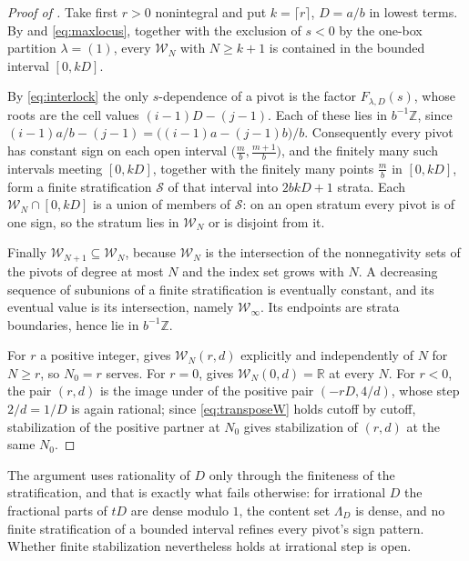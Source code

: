\documentclass[11pt,letterpaper]{article}
\newcommand{\Zint}{\mathbb{Z}}
\newcommand{\Rr}{\mathbb{R}}
\begin{document}
\begin{proof}[Proof of ]
Take first $r>0$ nonintegral and put $k=\lceil r\rceil$, $D=a/b$ in lowest terms.
By  and \eqref{eq:maxlocus}, together with the exclusion of $s<0$
by the one-box partition $\lambda=(1)$, every $\mathcal{W}_N$ with $N\ge k+1$ is
contained in the bounded interval $[0,kD]$.

By \eqref{eq:interlock} the only $s$-dependence of a pivot is the factor
$F_{\lambda,D}(s)$, whose roots are the cell values $(i-1)D-(j-1)$. Each of these
lies in $b^{-1}\Zint$, since $(i-1)a/b-(j-1)=\bigl((i-1)a-(j-1)b\bigr)/b$.
Consequently every pivot has constant sign on each open interval
$\bigl(\tfrac mb,\tfrac{m+1}{b}\bigr)$, and the finitely many such intervals
meeting $[0,kD]$, together with the finitely many points $\tfrac mb$ in $[0,kD]$,
form a finite stratification $\mathcal{S}$ of that interval into
$2bkD+1$ strata. Each $\mathcal{W}_N\cap[0,kD]$ is a union of members of
$\mathcal{S}$: on an open stratum every pivot is of one sign, so the stratum lies
in $\mathcal{W}_N$ or is disjoint from it.

Finally $\mathcal{W}_{N+1}\subseteq\mathcal{W}_N$, because $\mathcal{W}_N$ is the
intersection of the nonnegativity sets of the pivots of degree at most $N$ and
the index set grows with $N$. A decreasing sequence of subunions of a finite
stratification is eventually constant, and its eventual value is its
intersection, namely $\mathcal{W}_\infty$. Its endpoints are strata boundaries,
hence lie in $b^{-1}\Zint$.

For $r$ a positive integer,  gives $\mathcal{W}_N(r,d)$
explicitly and independently of $N$ for $N\ge r$, so $N_0=r$ serves. For $r=0$,
 gives $\mathcal{W}_N(0,d)=\Rr$ at every $N$. For $r<0$, the
pair $(r,d)$ is the image under  of the positive pair
$(-rD,4/d)$, whose step $2/d=1/D$ is again rational; since
\eqref{eq:transposeW} holds cutoff by cutoff, stabilization of the positive
partner at $N_0$ gives stabilization of $(r,d)$ at the same $N_0$.
\end{proof}

The argument uses rationality of $D$ only through the finiteness of the
stratification, and that is exactly what fails otherwise: for irrational $D$ the
fractional parts of $tD$ are dense modulo $1$, the content set $\Lambda_D$ is
dense, and no finite stratification of a bounded interval refines every pivot's
sign pattern. Whether finite stabilization nevertheless holds at irrational step
is open.
\end{document}
